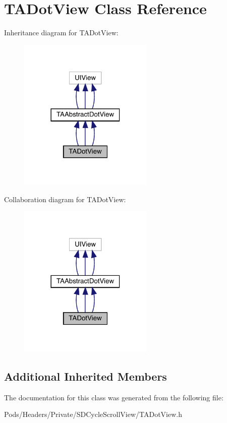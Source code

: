 \hypertarget{interface_t_a_dot_view}{}\section{T\+A\+Dot\+View Class Reference}
\label{interface_t_a_dot_view}


Inheritance diagram for T\+A\+Dot\+View\+:\nopagebreak
\begin{figure}[H]
\begin{center}
\leavevmode
\includegraphics[width=182pt]{interface_t_a_dot_view__inherit__graph}
\end{center}
\end{figure}


Collaboration diagram for T\+A\+Dot\+View\+:\nopagebreak
\begin{figure}[H]
\begin{center}
\leavevmode
\includegraphics[width=182pt]{interface_t_a_dot_view__coll__graph}
\end{center}
\end{figure}
\subsection*{Additional Inherited Members}


The documentation for this class was generated from the following file\+:\begin{DoxyCompactItemize}
\item 
Pods/\+Headers/\+Private/\+S\+D\+Cycle\+Scroll\+View/T\+A\+Dot\+View.\+h\end{DoxyCompactItemize}
